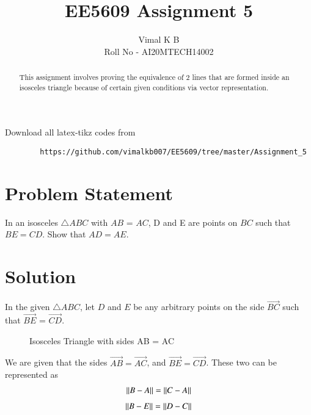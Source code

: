 \documentclass[journal,12pt,twocolumn]{IEEEtran}
\begin{document}
	
	
	\title{EE5609 Assignment 5}
	\author{Vimal K B \\Roll No - AI20MTECH14002}
	
	\maketitle
	\newpage
	\bigskip
	
	\renewcommand{\thefigure}{\theenumi}
	\renewcommand{\thetable}{\theenumi}
	
	\begin{abstract}
		This assignment involves proving the equivalence of 2 lines that are formed inside an isosceles triangle because of certain given conditions via vector representation.
	\end{abstract}

	Download all latex-tikz codes from 
	
	\begin{lstlisting}
		https://github.com/vimalkb007/EE5609/tree/master/Assignment_5
	\end{lstlisting}
	
	\section{Problem Statement}
In an isosceles $\triangle ABC$ with $AB$ = $AC$, D and E are points on $BC$ such that $BE = CD$. Show that $AD = AE$. 
	\section{Solution}
	
	In the given  $\triangle ABC$, let $D$ and $E$ be any arbitrary points on the side $\vec{BC}$ such that $\vec{BE}$ = $\vec{CD}$.
	
	\renewcommand{\thefigure}{1}
	\begin{figure}[!ht] \label{fig:two_triangles}
		\centering
		\resizebox{\columnwidth}{!}{}
		\caption{Isosceles Triangle with sides AB = AC}
	\end{figure}
	We are given that the sides $\vec{AB} = \vec{AC}$, and $\vec{BE} = \vec{CD}$. These two can be represented as
	\begin{align}\label{eq:fact1}
		\left\lVert B-A\right\rVert = \left\lVert C-A\right\rVert
	\end{align}
	\begin{align}\label{eq:fact2}
		\left\lVert B-E\right\rVert = \left\lVert D-C\right\rVert
	\end{align}
	
\end{document}
